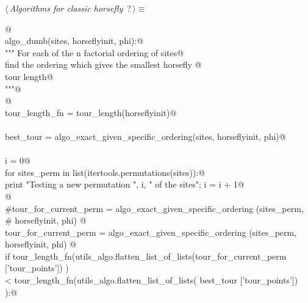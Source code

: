 \documentclass[11.5pt]{report}
\begin{document}
\begin{flushleft} \small
\begin{minipage}{\linewidth}\label{scrap19}\raggedright\small
{} $\langle\,${\itshape Algorithms for classic horsefly}\nobreak\ {\footnotesize {?}}$\,\rangle\equiv$
\vspace{-1ex}
\begin{list}{}{} \item
\mbox{}\verb@   @\\
\mbox{}\verb@def algo_dumb(sites, horseflyinit, phi):@\\
\mbox{}\verb@    """ For each of the n factorial ordering of sites@\\
\mbox{}\verb@    find the ordering which gives the smallest horsefly @\\
\mbox{}\verb@    tour length@\\
\mbox{}\verb@    """@\\
\mbox{}\verb@    @\\
\mbox{}\verb@    tour_length_fn = tour_length(horseflyinit)@\\
\mbox{}\verb@@\\
\mbox{}\verb@    best_tour = algo_exact_given_specific_ordering(sites, horseflyinit, phi)@\\
\mbox{}\verb@@\\
\mbox{}\verb@    i = 0@\\
\mbox{}\verb@    for sites_perm in list(itertools.permutations(sites)):@\\
\mbox{}\verb@        print "Testing a new permutation ", i, " of the sites"; i = i + 1@\\
\mbox{}\verb@          @\\
\mbox{}\verb@        #tour_for_current_perm = algo_exact_given_specific_ordering (sites_perm, \@\\
\mbox{}\verb@        #                                                             horseflyinit, phi) @\\
\mbox{}\verb@        tour_for_current_perm = algo_exact_given_specific_ordering (sites_perm, \@\\
\mbox{}\verb@                                                                    horseflyinit, phi) @\\
\mbox{}\verb@        if tour_length_fn(utils_algo.flatten_list_of_lists(tour_for_current_perm ['tour_points']) ) \@\\
\mbox{}\verb@         < tour_length_fn(utils_algo.flatten_list_of_lists(            best_tour ['tour_points']) ):@\\

\end{list}
\end{minipage}
\end{flushleft}
\end{document}
